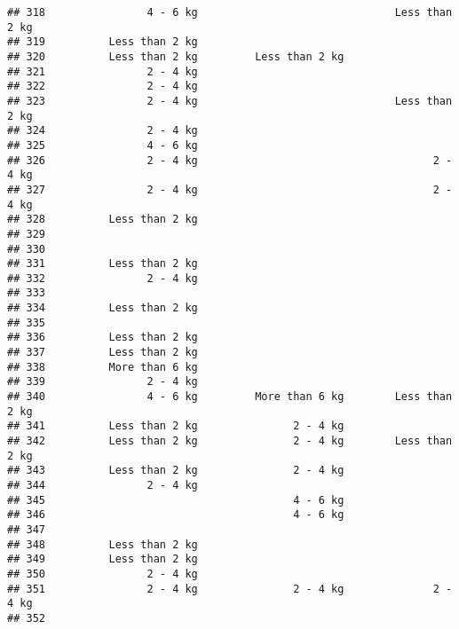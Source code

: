 \documentclass[
]{article}
\begin{document}
\begin{verbatim}
## 318                4 - 6 kg                               Less than 2 kg
## 319          Less than 2 kg                                             
## 320          Less than 2 kg         Less than 2 kg                      
## 321                2 - 4 kg                                             
## 322                2 - 4 kg                                             
## 323                2 - 4 kg                               Less than 2 kg
## 324                2 - 4 kg                                             
## 325                4 - 6 kg                                             
## 326                2 - 4 kg                                     2 - 4 kg
## 327                2 - 4 kg                                     2 - 4 kg
## 328          Less than 2 kg                                             
## 329                                                                     
## 330                                                                     
## 331          Less than 2 kg                                             
## 332                2 - 4 kg                                             
## 333                                                                     
## 334          Less than 2 kg                                             
## 335                                                                     
## 336          Less than 2 kg                                             
## 337          Less than 2 kg                                             
## 338          More than 6 kg                                             
## 339                2 - 4 kg                                             
## 340                4 - 6 kg         More than 6 kg        Less than 2 kg
## 341          Less than 2 kg               2 - 4 kg                      
## 342          Less than 2 kg               2 - 4 kg        Less than 2 kg
## 343          Less than 2 kg               2 - 4 kg                      
## 344                2 - 4 kg                                             
## 345                                       4 - 6 kg                      
## 346                                       4 - 6 kg                      
## 347                                                                     
## 348          Less than 2 kg                                             
## 349          Less than 2 kg                                             
## 350                2 - 4 kg                                             
## 351                2 - 4 kg               2 - 4 kg              2 - 4 kg
## 352                                                                     

\end{verbatim}
\end{document}
